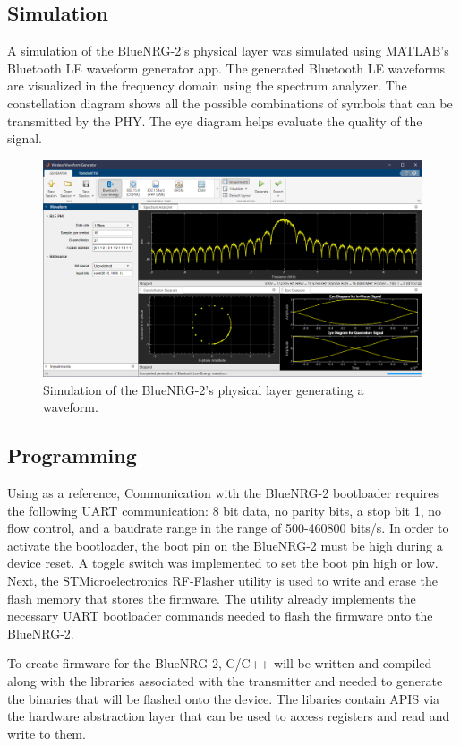 \documentclass[12pt,journal,onecolumn,draftclsnofoot]{IEEEtran}
\begin{document}
\subsection{Simulation}
A simulation of the BlueNRG-2's physical layer was simulated using MATLAB's Bluetooth LE waveform generator app. The generated Bluetooth LE waveforms are visualized in the frequency domain using the spectrum analyzer. The constellation diagram shows all the possible combinations of symbols that can be transmitted by the PHY. The eye diagram helps evaluate the quality of the signal.
\begin{figure}[H]
\centering
\includegraphics[width=\textwidth]{Pics/blesim.png}
\caption{Simulation of the BlueNRG-2's physical layer generating a waveform.}
\label{fig:ble}
\end{figure}

\subsection{Programming}
Using \cite{pm0257,an4872} as a reference, Communication with the BlueNRG-2 bootloader requires the following UART communication: 8 bit data, no parity bits, a stop bit 1, no flow control, and a baudrate range in the range of 500-460800 bits/s. In order to activate the bootloader, the boot pin on the BlueNRG-2 must be high during a device reset. A toggle switch was implemented to set the boot pin high or low. Next, the STMicroelectronics RF-Flasher utility is used to write and erase the flash memory that stores the firmware. The utility already implements the necessary UART bootloader commands needed to flash the firmware onto the BlueNRG-2. \par
To create firmware for the BlueNRG-2, C/C++ will be written and compiled along with the libraries associated with the transmitter and needed to generate the binaries that will be flashed onto the device. The libaries contain APIS via the hardware abstraction layer that can be used to access registers and read and write to them.
\end{document}
